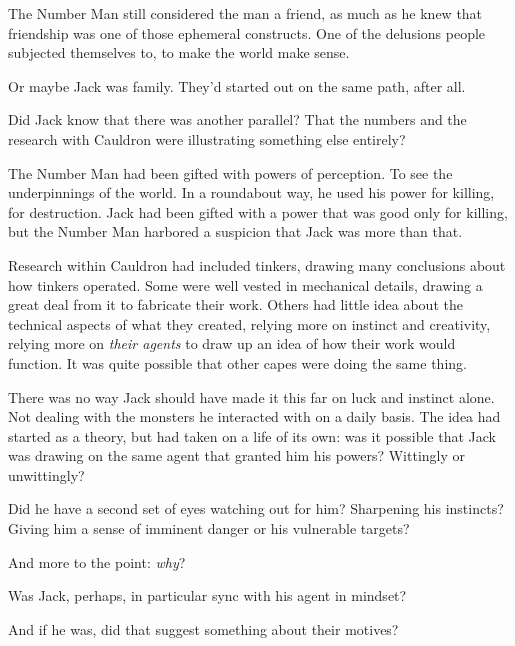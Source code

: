The Number Man still considered the man a friend, as much as he knew that friendship was one of those ephemeral constructs.  One of the delusions people subjected themselves to, to make the world make sense.



Or maybe Jack was family.  They'd started out on the same path, after all.



Did Jack know that there was another parallel?  That the numbers and the research with Cauldron were illustrating something else entirely?



The Number Man had been gifted with powers of perception.  To see the underpinnings of the world.  In a roundabout way, he used his power for killing, for destruction.  Jack had been gifted with a power that was good only for killing, but the Number Man harbored a suspicion that Jack was more than that.



Research within Cauldron had included tinkers, drawing many conclusions about how tinkers operated.  Some were well vested in mechanical details, drawing a great deal from it to fabricate their work.  Others had little idea about the technical aspects of what they created, relying more on instinct and creativity, relying more on \emph{their agent}\emph{s} to draw up an idea of how their work would function.  It was quite possible that other capes were doing the same thing.



There was no way Jack should have made it this far on luck and instinct alone.  Not dealing with the monsters he interacted with on a daily basis.  The idea had started as a theory, but had taken on a life of its own: was it possible that Jack was drawing on the same agent that granted him his powers?  Wittingly or unwittingly?



Did he have a second set of eyes watching out for him?  Sharpening his instincts?  Giving him a sense of imminent danger or his vulnerable targets?



And more to the point: \emph{why}?



Was Jack, perhaps, in particular sync with his agent in mindset?



And if he was, did that suggest something about their motives?





